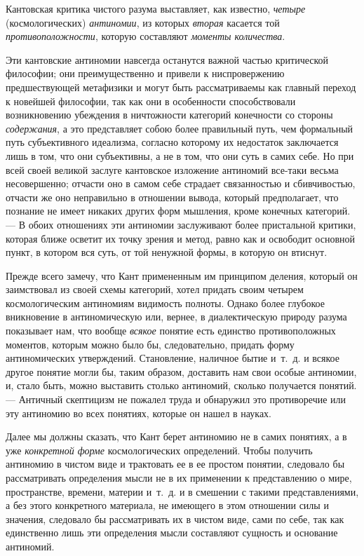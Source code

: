 Кантовская критика чистого разума выставляет, как известно,
{\em четыре} (космологических)
{\em антиномии}, из которых
{\em вторая} касается той
{\em противоположности}, которую составляют
{\em моменты количества}.

Эти кантовские антиномии навсегда останутся важной частью критической
философии; они преимущественно и привели к ниспровержению предшествующей
метафизики и могут быть рассматриваемы как главный переход к новейшей
философии, так как они в особенности способствовали возникновению убеждения
в ничтожности категорий конечности со стороны
{\em содержания}, а это представляет собою более
правильный путь, чем формальный путь субъективного идеализма, согласно
которому их недостаток заключается лишь в том, что они субъективны, а не в
том, что они суть в самих себе. Но при всей своей великой заслуге
кантовское изложение антиномий все-таки весьма несовершенно; отчасти оно в
самом себе страдает связанностью и сбивчивостью, отчасти же оно неправильно
в отношении вывода, который предполагает, что познание не имеет никаких
других форм мышления, кроме конечных категорий. — В обоих отношениях эти
антиномии заслуживают более пристальной критики, которая ближе осветит их
точку зрения и метод, равно как и освободит основной пункт, в котором вся
суть, от той ненужной формы, в которую он втиснут.

Прежде всего замечу, что Кант примененным им принципом деления, который он
заимствовал из своей схемы категорий, хотел придать своим четырем
космологическим антиномиям видимость полноты. Однако более глубокое
вникновение в антиномическую или, вернее, в диалектическую природу разума
показывает нам, что вообще {\em всякое} понятие есть
единство противоположных моментов, которым можно было бы, следовательно,
придать форму антиномических утверждений. Становление, наличное бытие
и~т.~д. и всякое другое понятие могли бы, таким образом, доставить нам свои
особые антиномии, и, стало быть, можно выставить столько антиномий, сколько
получается понятий. — Античный скептицизм не пожалел труда и обнаружил это
противоречие или эту антиномию во всех понятиях, которые он нашел в науках.

Далее мы должны сказать, что Кант берет антиномию не в самих понятиях, а в
уже {\em конкретной форме} космологических определений.
Чтобы получить антиномию в чистом виде и трактовать ее в ее простом
понятии, следовало бы рассматривать определения мысли не в их применении к
представлению о мире, пространстве, времени, материи и~т.~д. и в смешении с
такими представлениями, а без этого конкретного материала, не имеющего в
этом отношении силы и значения, следовало бы рассматривать их в чистом
виде, сами по себе, так как единственно лишь эти определения мысли
составляют сущность и основание антиномий.

